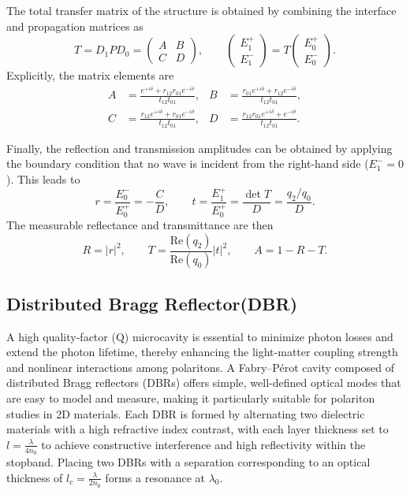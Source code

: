 The total transfer matrix of the structure is obtained by combining the interface and propagation matrices as
\begin{equation}
T = D_1 P D_0 =
\begin{pmatrix}
A & B \\
C & D
\end{pmatrix},
\qquad
\begin{pmatrix}
E_1^{+} \\
E_1^{-}
\end{pmatrix}
=
T
\begin{pmatrix}
E_0^{+} \\
E_0^{-}
\end{pmatrix}.
\label{eq:T_matrix}
\end{equation}
Explicitly, the matrix elements are
\begin{align}
A &= \frac{e^{+i\delta} + r_{12} r_{01} e^{-i\delta}}{t_{12} t_{01}}, &
B &= \frac{r_{01} e^{+i\delta} + r_{12} e^{-i\delta}}{t_{12} t_{01}}, \label{eq:AB_elements}\\[6pt]
C &= \frac{r_{12} e^{+i\delta} + r_{01} e^{-i\delta}}{t_{12} t_{01}}, &
D &= \frac{r_{12} r_{01} e^{+i\delta} + e^{-i\delta}}{t_{12} t_{01}} .
\label{eq:CD_elements}
\end{align}

Finally, the reflection and transmission amplitudes can be obtained by applying the boundary condition that no wave is incident from the right-hand side ($E_1^- = 0$). 
This leads to
\begin{equation}
r = \frac{E_0^-}{E_0^+} = -\frac{C}{D},
\qquad
t = \frac{E_1^+}{E_0^+} = \frac{\det T}{D} = \frac{q_2/q_0}{D}.
\label{eq:rt}
\end{equation}
The measurable reflectance and transmittance are then
\begin{equation}
R = |r|^2,
\qquad
T = \frac{\mathrm{Re}(q_2)}{\mathrm{Re}(q_0)} |t|^2,
\qquad
A = 1 - R - T.
\label{eq:RTA}
\end{equation}

\subsection{Distributed Bragg Reflector(DBR)}
\label{Distributed Bragg Reflector(DBR)}
A high quality-factor (Q) microcavity is essential to minimize photon losses and extend the photon lifetime, thereby enhancing the light-matter coupling strength and nonlinear interactions among polaritons. 
A Fabry–Pérot cavity composed of distributed Bragg reflectors (DBRs) offers simple, well-defined optical modes that are easy to model and measure, making it particularly suitable for polariton studies in 2D materials. 
Each DBR is formed by alternating two dielectric materials with a high refractive index contrast, with each layer thickness set to $l = \frac {\lambda}{4 n_0}$ to achieve constructive interference and high reflectivity within the stopband. 
Placing two DBRs with a separation corresponding to an optical thickness of $l_c = \frac {\lambda}{2 n_0}$ forms a resonance at $\lambda_0$.

